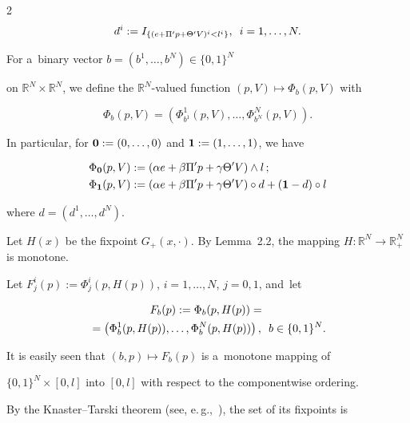 \begin{multicols}{2}
$$

d^i := I_{\{ (e + \Pi' p + \Theta' V)^i < l^i \}}, \enskip i=1,\dots,N. 

$$ 



For a~binary vector  $b=(b^1,\ldots ,b^N) \in \{0, 1\}^N$ 

 on $\mathbb{R}^N\times \mathbb{R}^N$, we define the $\mathbb{R}^N$-valued function  $(p,V)\mapsto \Phi_b (p, V)$ with 

$$

\Phi_b (p, V) = \left(\Phi^1_{b^1}(p, V), \dots, \Phi^N_{b^N}(p, V) \right).

$$ 



In particular, for ${\bf 0}:=(0,\ldots ,0)$ and ${\bf 1}:=(1,\ldots ,1)$, we have 

\begin{align*} 

\Phi_{\bf 0}(p, V) &:=  \left(\alpha e+\beta \Pi' p  + \gamma \Theta' V\right)\wedge l\,; \\ 

\Phi_{\bf 1}(p, V) &:= \left(\alpha e+\beta \Pi' p + \gamma \Theta' V\right)\circ d  + ({\bf 1} - d) \circ l

\end{align*} 

where $d = (d^1, \dots, d^N)$. 



 





Let  $H(x)$ be the fixpoint $G_+(x, \cdot)$. By  Lemma~2.2, the mapping $H: \mathbb{R}^N \to \mathbb{R}^N_+$ is monotone.

Let $F^i_j(p) := \Phi^i_j(p, H(p))$, $i=1,\dots, N$,   $j=0,1$, and~let  

\begin{multline*}

F_b(p) := \Phi_b(p, H(p))={}\\

{}=\left( \Phi^1_b(p, H(p)),\dots,  \Phi^N_b(p, H(p))\right), \enskip b\in \{0,1\}^N.  

\end{multline*}

It is easily seen that  $(b,p)\mapsto F_b(p)$ is a~monotone mapping of 

$\{0,1\}^N\times [0,l]$ into $[0,l]$ with respect to the componentwise ordering.

By the Knaster--Tarski theorem (see, e.\,g.,~\cite{kabanov2018clearing}), the set of its fixpoints is


\end{multicols}
